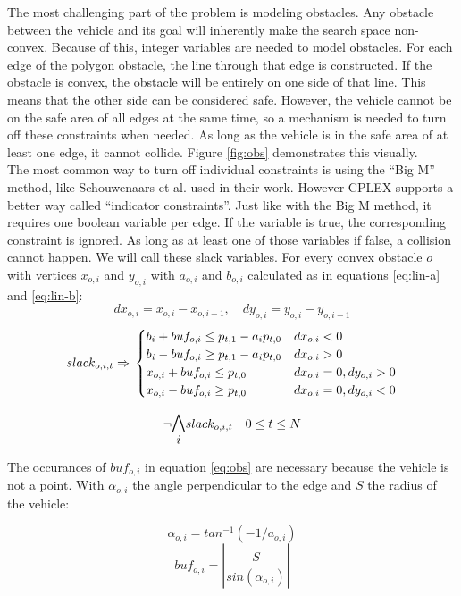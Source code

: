 The most challenging part of the problem is modeling obstacles. Any obstacle between the vehicle and its goal will inherently make the search space non-convex. Because of this, integer variables are needed to model obstacles. For each edge of the polygon obstacle, the line through that edge is constructed. If the obstacle is convex, the obstacle will be entirely on one side of that line. This means that the other side can be considered safe. However, the vehicle cannot be on the safe area of all edges at the same time, so a mechanism is needed to turn off these constraints when needed. As long as the vehicle is in the safe area of at least one edge, it cannot collide.  Figure \ref{fig:obs} demonstrates this visually. \\

The most common way to turn off individual constraints is using the ``Big M'' method, like Schouwenaars et al. \cite{Schouwenaars2001} used in their work. However CPLEX supports a better way called ``indicator constraints''. Just like with the Big M method, it requires one boolean variable per edge. If the variable is true, the corresponding constraint is ignored. As long as at least one of those variables if false, a collision cannot happen. We will call these slack variables. For every convex obstacle $o$ with vertices $x_{o,i}$ and $y_{o,i}$ with $a_{o,i}$ and $b_{o,i}$ calculated as in equations \ref{eq:lin-a} and \ref{eq:lin-b}:
\begin{equation*}
dx_{o,i} = x_{o,i} - x_{o,i-1}, \quad dy_{o,i} = y_{o,i} - y_{o,i-1}
\end{equation*}
\begin{equation}
\label{eq:obs}
slack_{o,i,t} \Rightarrow \\
\begin{cases}
b_i + buf_{o,i} \leq p_{t,1} - a_i p_{t,0} & dx_{o,i} < 0 \\
b_i - buf_{o,i}  \geq p_{t,1} - a_i p_{t,0} & dx_{o,i} > 0 \\
x_{o,i} + buf_{o,i}  \leq p_{t,0} & dx_{o,i} = 0, dy_{o,i} > 0 \\
x_{o,i} - buf_{o,i}  \geq p_{t,0} & dx_{o,i} = 0, dy_{o,i} < 0 \\
\end{cases}
\end{equation}

\begin{equation}
\neg \mathlarger{\mathlarger{\bigwedge_{i}}} slack_{o,i,t} \quad 0 \leq t \leq N
\end{equation}

The occurances of $buf_{o,i}$ in equation \ref{eq:obs} are necessary because the vehicle is not a point. With $\alpha_{o,i}$ the angle perpendicular to the edge and $S$ the radius of the vehicle:

\begin{equation}
\alpha_{o,i} = tan^{-1}( -1 / a_{o,i})
\end{equation}
\begin{equation}
buf_{o,i} = |\dfrac{S}{sin(\alpha_{o,i})}|
\end{equation}